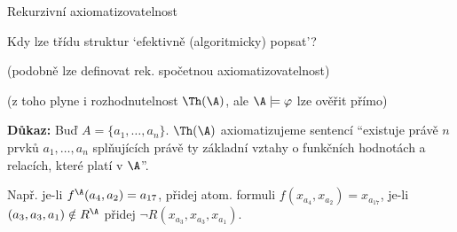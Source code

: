 \documentclass{beamer}
\begin{document}
\begin{frame}{Rekurzivní axiomatizovatelnost}

    \pause
    Kdy lze třídu struktur `efektivně (algoritmicky) popsat'?

    \pause

    \pause
    (podobně lze definovat \alert{rek. spočetnou axiomatizovatelnost})

    \pause
        
    \pause
    (z toho plyne i rozhodnutelnost $\Th(\A)$, ale $\A\models\varphi$ lze ověřit přímo)

    \pause
    \textbf{Důkaz:} \pause
    Buď $A=\{a_1,\dots,a_n\}$. $\Th(\A)$ axiomatizujeme sentencí ``existuje právě $n$ prvků $a_1,\dots,a_n$ splňujících právě ty \alert{základní vztahy} o funkčních hodnotách a relacích, které platí v $\A$''.
    
    \pause
    Např. je-li $f^\A(a_4, a_2)=a_{17}$, přidej atom. formuli $f(x_{a_4},x_{a_2})=x_{a_{17}}$, je-li $(a_3,a_3,a_1)\notin R^\A$ přidej $\neg R(x_{a_3},x_{a_3},x_{a_1})$.\hfill\qedsymbol

\end{frame}
\end{document}
